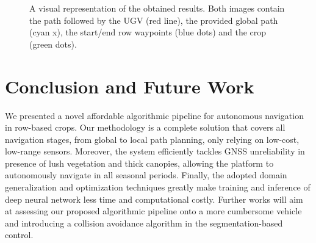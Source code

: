 \documentclass[journal]{IEEEtran}
\begin{document}
\begin{figure}[!h]
\centering
{}
\hfil
{}
\caption{A visual representation of the obtained results. Both images contain the path followed by the UGV (red line), the provided global path (cyan x), the start/end row waypoints (blue dots) and the crop (green dots).}
\label{fig:visual_results}
\end{figure}

\section{Conclusion and Future Work}
\label{conclusions}
We presented a novel affordable algorithmic pipeline for autonomous navigation in row-based crops. Our methodology is a complete solution that covers all navigation stages, from global to local path planning, only relying on low-cost, low-range sensors. Moreover, the system efficiently tackles GNSS unreliability in presence of lush vegetation and thick canopies, allowing the platform to autonomously navigate in all seasonal periods. Finally, the adopted domain generalization and optimization techniques greatly make training and inference of deep neural network less time and computational costly. Further works will aim at assessing our proposed algorithmic pipeline onto a more cumbersome vehicle and introducing a collision avoidance algorithm in the segmentation-based control.
\end{document}
